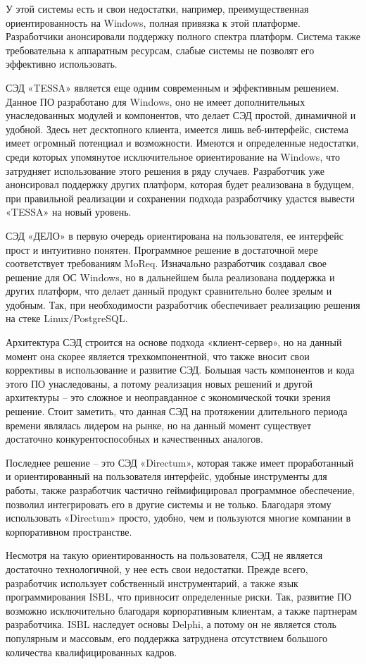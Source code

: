 У этой системы есть и свои недостатки, например, преимущественная ориентированность на Windows, полная привязка к этой платформе. Разработчики анонсировали поддержку полного спектра платформ. Система также требовательна к аппаратным ресурсам, слабые системы не позволят его эффективно использовать. 

СЭД «TESSA» является еще одним современным и эффективным решением. Данное ПО разработано для Windows, оно не имеет дополнительных унаследованных модулей и компонентов, что делает СЭД простой, динамичной и удобной. Здесь нет десктопного клиента, имеется лишь веб-интерфейс, система имеет огромный потенциал и возможности. Имеются и определенные недостатки, среди которых упомянутое исключительное ориентирование на Windows, что затрудняет использование этого решения в ряду случаев. Разработчик уже анонсировал поддержку других платформ, которая будет реализована в будущем, при правильной реализации и сохранении подхода разработчику удастся вывести «TESSA» на новый уровень.  

СЭД «ДЕЛО» в первую очередь ориентирована на пользователя, ее интерфейс прост и интуитивно понятен. Программное решение в достаточной мере соответствует требованиям MoReq. Изначально разработчик создавал свое решение для ОС Windows, но в дальнейшем была реализована поддержка и других платформ, что делает данный продукт сравнительно более зрелым и удобным. Так, при необходимости разработчик обеспечивает реализацию решения на стеке Linux/PostgreSQL. 

Архитектура СЭД строится на основе подхода «клиент-сервер», но на данный момент она скорее является трехкомпонентной, что также вносит свои коррективы в использование и развитие СЭД. Большая часть компонентов и кода этого ПО унаследованы, а потому реализация новых решений и другой архитектуры – это сложное и неоправданное с экономической точки зрения решение. Стоит заметить, что данная СЭД на протяжении длительного периода времени являлась лидером на рынке, но на данный момент существует достаточно конкурентоспособных и качественных аналогов. 

Последнее решение – это СЭД «Directum», которая также имеет проработанный и ориентированный на пользователя интерфейс, удобные инструменты для работы, также разработчик частично геймифицировал программное обеспечение, позволил интегрировать его в другие системы и не только. Благодаря этому использовать «Directum» просто, удобно, чем и пользуются многие компании в корпоративном пространстве. 

Несмотря на такую ориентированность на пользователя, СЭД не является достаточно технологичной, у нее есть свои недостатки. Прежде всего, разработчик использует собственный инструментарий, а также язык программирования ISBL, что привносит определенные риски. Так, развитие ПО возможно исключительно благодаря корпоративным клиентам, а также партнерам разработчика. ISBL наследует основы Delphi, а потому он не является столь популярным и массовым, его поддержка затруднена отсутствием большого количества квалифицированных кадров. 

